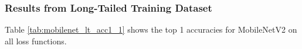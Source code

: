 



% 

\subsubsection{Results from Long-Tailed Training Dataset}

Table \ref{tab:mobilenet_lt_acc1_1} shows the top 1 accuracies for MobileNetV2 on all loss functions.


